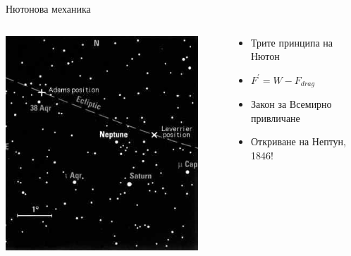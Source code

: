 \documentclass[10pt,a4paper]{beamer}
\begin{document}
        \begin{frame}{ Нютонова механика }
            \begin{columns}
                \begin{column}{0.5\textwidth}
                    \includegraphics[width=0.9\textwidth]{images/newton_neptune_discovery.png}
                \end{column}
                \begin{column}{0.5\textwidth}
                    \begin{itemize}
                        \item Трите принципа на Нютон
                        \item $ F^{\prime} = W - F_{drag} $
                        \item Закон за Всемирно привличане
                        \item Откриване на Нептун, 1846!
                    \end{itemize}
                \end{column}
            \end{columns}
        \end{frame}
    
\end{document}
